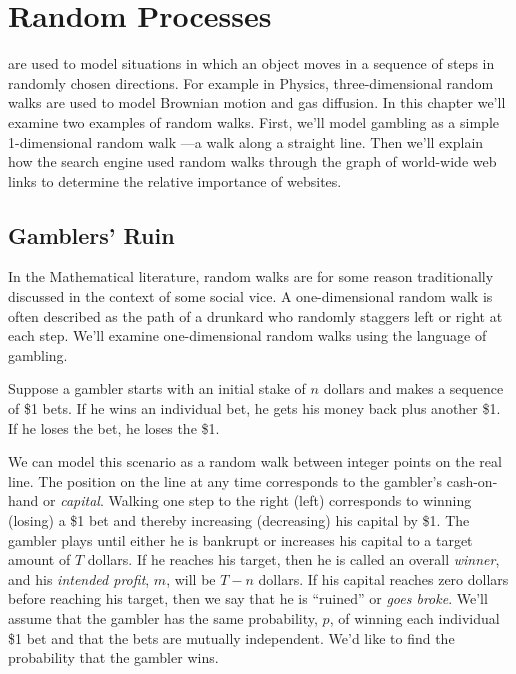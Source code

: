 \chapter{Random Processes}\label{ran_process_chap}

 are used to model situations in which an object moves
in a sequence of steps in randomly chosen directions.  For example in
Physics, three-dimensional random walks are used to model Brownian motion
and gas diffusion.  In this chapter we'll examine two examples of random
walks.  First, we'll model gambling as a simple 1-dimensional random walk
---a walk along a straight line.  Then we'll explain how the 
search engine used random walks through the graph of world-wide web links
to determine the relative importance of websites.




\section{Gamblers' Ruin}

\begin{editingnotes}
In the Mathematical literature, random walks are for some reason
traditionally discussed in the context of some social vice.  A
one-dimensional random walk is often described as the path of a drunkard
who randomly staggers left or right at each step.  We'll examine
one-dimensional random walks using the language of gambling.
\end{editingnotes}

Suppose a gambler starts with an initial stake of $n$ dollars and
makes a sequence of \$1 bets.  If he wins an individual bet, he gets
his money back plus another \$1.  If he loses the bet, he loses the
\$1.

We can model this scenario as a random walk between integer points on
the real line.  The position on the line at any time corresponds to
the gambler's cash-on-hand or \emph{capital}.  Walking one step to the
right (left) corresponds to winning (losing) a \$1 bet and thereby
increasing (decreasing) his capital by \$1.  The gambler plays until
either he is bankrupt or increases his capital to a target amount of
$T$ dollars.  If he reaches his target, then he is called an overall
\emph{winner}, and his \emph{intended profit}, $m$, will be $T-n$
dollars.  If his capital reaches zero dollars before reaching his
target, then we say that he is ``ruined'' or \emph{goes broke}.  We'll
assume that the gambler has the same probability, $p$, of winning each
individual \$1 bet and that the bets are mutually independent.  We'd
like to find the probability that the gambler wins.

